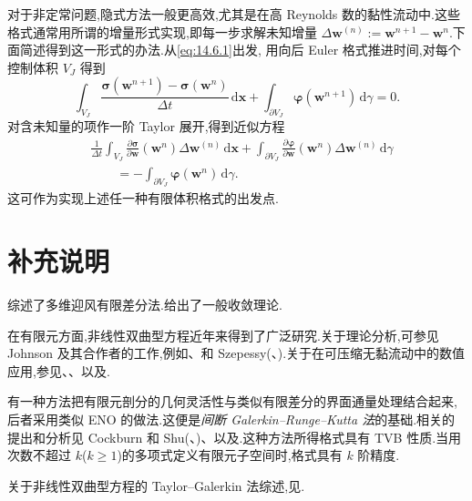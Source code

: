 对于非定常问题,隐式方法一般更高效,尤其是在高 Reynolds 数的黏性流动中.这些格式通常用所谓的增量形式实现,即每一步求解未知增量 \(\Delta\boldsymbol{w}^{(n)}:=\boldsymbol{w}^{n+1}-\boldsymbol{w}^n\).下面简述得到这一形式的办法.从\eqref{eq:14.6.1}出发,
用向后 Euler 格式推进时间,对每个控制体积 \(V_J\) 得到
\[
  \int_{V_J}\frac{\boldsymbol{\sigma}(\boldsymbol{w}^{n+1})-\boldsymbol{\sigma}(\boldsymbol{w}^n)}{\Delta t}
             \,\mathrm d\boldsymbol{x}
        +\int_{\partial V_J}\boldsymbol{\varphi}(\boldsymbol{w}^{n+1})\,\mathrm d\gamma=0.
\]
对含未知量的项作一阶 Taylor 展开,得到近似方程
\[
  \begin{aligned}
    &\frac1{\Delta t}\int_{V_J}
         \frac{\partial\boldsymbol{\sigma}}{\partial\boldsymbol{w}}(\boldsymbol{w}^n)
            \Delta\boldsymbol{w}^{(n)}\,\mathrm d\boldsymbol{x}
       +\int_{\partial V_J}\frac{\partial\boldsymbol{\varphi}}{\partial\boldsymbol{w}}(\boldsymbol{w}^n)
            \Delta\boldsymbol{w}^{(n)}\,\mathrm d\gamma\\
    &\qquad=-\int_{\partial V_J}\boldsymbol{\varphi}(\boldsymbol{w}^n)\,\mathrm d\gamma.
  \end{aligned}
\]
这可作为实现上述任一种有限体积格式的出发点.

\section{补充说明}\label{sec:14.7}

综述了多维迎风有限差分法.给出了一般收敛理论.

在有限元方面,非线性双曲型方程近年来得到了广泛研究.关于理论分析,可参见 Johnson 及其合作者的工作,例如、和 Szepessy(、).关于在可压缩无黏流动中的数值应用,参见、、以及.

有一种方法把有限元剖分的几何灵活性与类似有限差分的界面通量处理结合起来,后者采用类似 ENO 的做法.这便是\emph{间断 Galerkin--Runge--Kutta 法}的基础.相关的提出和分析见 Cockburn 和 Shu(、)、以及.这种方法所得格式具有 TVB 性质.当用次数不超过 \(k\)(\(k\ge1\))的多项式定义有限元子空间时,格式具有 \(k\) 阶精度.

关于非线性双曲型方程的 Taylor--Galerkin 法综述,见.
